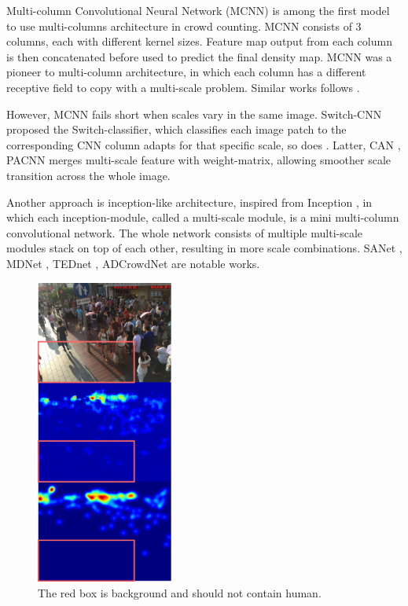 Multi-column Convolutional Neural Network (MCNN) \cite{zhang2016single} is among the first model to use multi-columns architecture in crowd counting. MCNN consists of 3 columns, each with different kernel sizes. Feature map output from each column is then concatenated before used to predict the final density map. MCNN was a pioneer to multi-column architecture, in which each column has a different receptive field to copy with a multi-scale problem. Similar works follows \cite{zhang2019crowd, 9053780}. 

However, MCNN fails short when scales vary in the same image. Switch-CNN \cite{sam2017switching} proposed the Switch-classifier, which classifies each image patch to the corresponding CNN column adapts for that specific scale, so does \cite{8965799}. Latter, CAN \cite{liu2019context}, PACNN \cite{shi2019revisiting} merges multi-scale feature with weight-matrix, allowing smoother scale transition across the whole image. 

Another approach is inception-like architecture, inspired from Inception \cite{szegedy2015going}, in which each inception-module, called a multi-scale module, is a mini multi-column convolutional network. The whole network consists of multiple multi-scale modules stack on top of each other, resulting in more scale combinations. SANet \cite{cao2018scale}, MDNet \cite{wang2019multi}, TEDnet \cite{jiang2019crowd}, ADCrowdNet \cite{liu2019adcrowdnet} are notable works. 


\begin{figure}[htbp]
\centerline{\includegraphics[width=0.4\textwidth]{Picture/problem/background_noise_shb.png}}
\caption{The red box is background and should not contain human.}
\label{fig:noise}
\end{figure}

